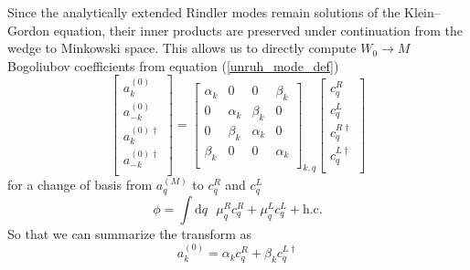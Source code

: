 \documentclass[12pt,a4paper]{article}
\newcommand{\dv}[1]{\mathrm{d} #1 \text{ }}
\begin{document}
Since the analytically extended Rindler modes remain solutions of the Klein–Gordon equation, their inner products are preserved under continuation from the wedge to Minkowski space.  This allows us to directly compute $W_0 \rightarrow M$ Bogoliubov coefficients from equation (\ref{unruh_mode_def})
\begin{equation}
  \left[ \begin{array}{l}
    a^{(0)}_k \\
    a^{(0)}_{-k} \\
    \hline
    a^{(0)\dagger}_k \\
    a^{(0)\dagger}_{-k} \\
 \end{array} \right] = 
  \left[
\begin{array}{rr|rr}
    \alpha_k &       0   &  0       & \beta_k \\
    0        & \alpha_k & \beta_k & 0 \\
    \hline
    0        & \beta_k   & \alpha_k & 0 \\
    \beta_k &    0      &   0      & \alpha_k \\
\end{array} \right]_{k,q}
\left[ \begin{array}{l}
    c^R_q \\
    c^L_q \\
    \hline
    c^{R\dagger}_q \\
    c^{L\dagger}_q \\
 \end{array} \right]
\end{equation}
for a change of basis from $a^{(M)}_q$ to $c^R_q$ and $c^L_q$
\begin{equation}
  \phi = \int \dv{q} \mu_q^R c_q^R + \mu_q^L c_q^L + \text{h.c.}
  \label{c_ladder}
\end{equation}
So that we can summarize the transform as
\begin{equation}
  a_k^{(0)} = \alpha_k c_q^R + \beta_k c_q^{L\dagger}
\label{a_in_c}
\end{equation}
\end{document}
